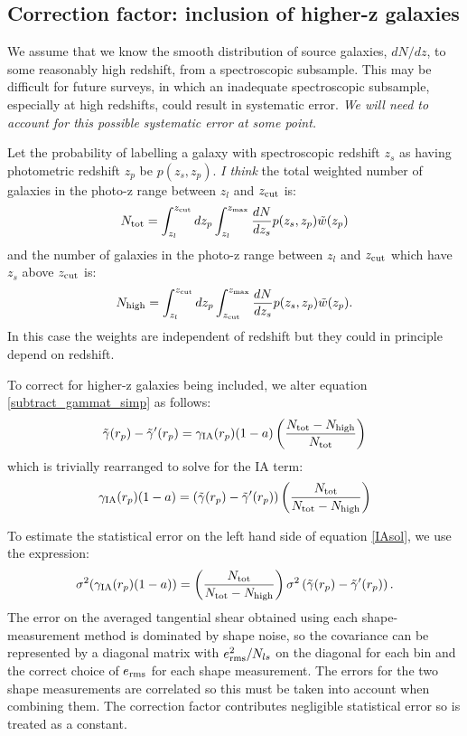 \documentclass[onecolumn,amsmath,aps,fleqn, superscriptaddress]{revtex4}
\begin{document}
\subsection*{Correction factor: inclusion of higher-z galaxies}
We assume that we know the smooth distribution of source galaxies, $dN / dz$, to some reasonably high redshift, from a spectroscopic subsample. This may be difficult for future surveys, in which an inadequate spectroscopic subsample, especially at high redshifts, could result in systematic error. {\it We will need to account for this possible systematic error at some point.}

Let the probability of labelling a galaxy with spectroscopic redshift $z_s$ as having photometric redshift $z_p$ be $p(z_s, z_p)$. {\it I think} the total weighted number of galaxies in the photo-z range between $z_l$ and $z_{\rm cut}$ is:
\begin{equation}
N_{\rm tot} = \int_{z_l}^{z_{\rm cut}} dz_p \int_{z_l}^{z_{\rm max}} \frac{dN}{dz_s} p(z_s, z_p) \tilde{w}(z_p)
\label{tot}
\end{equation}
and the number of galaxies in the photo-z range between $z_l$ and $z_{\rm cut}$ which have $z_s$ above $z_{\rm cut}$ is:
\begin{equation}
N_{\rm high} = \int_{z_l}^{z_{\rm cut}} dz_p \int_{z_{\rm cut}}^{z_{\rm max}} \frac{dN}{dz_s} p(z_s, z_p) \tilde{w}(z_p).
\label{high}
\end{equation}
In this case the weights are independent of redshift but they could in principle depend on redshift.

To correct for higher-z galaxies being included, we alter equation \ref{subtract_gammat_simp} as follows:
\begin{equation}
\tilde{\gamma}(r_p) - \tilde{\gamma}^\prime(r_p) = \gamma_{\rm IA}(r_p)(1-a) \left(\frac{N_{\rm tot} - N_{\rm high}}{N_{\rm tot}}\right)
\label{subtract_gammat_fac}
\end{equation}
which is trivially rearranged to solve for the IA term:
\begin{equation}
\gamma_{\rm IA}(r_p)(1-a) = \left(\tilde{\gamma}(r_p) - \tilde{\gamma}^\prime(r_p)\right) \left(\frac{N_{\rm tot}}{N_{\rm tot} - N_{\rm high}}\right)
\label{IAsol}
\end{equation}

To estimate the statistical error on the left hand side of equation \ref{IAsol}, we use the expression:
\begin{equation}
\sigma^2(\gamma_{\rm IA}(r_p)(1-a)) = \left(\frac{N_{\rm tot}}{N_{\rm tot} - N_{\rm high}}\right) \sigma^2\left(\tilde{\gamma}(r_p) - \tilde{\gamma}^\prime(r_p)\right).
\label{error}
\end{equation}
The error on the averaged tangential shear obtained using each shape-measurement method is dominated by shape noise, so the covariance can be represented by a diagonal matrix with $e_{\rm rms}^2 / N_{ls}$ on the diagonal for each bin and the correct choice of $e_{\rm rms}$ for each shape measurement. The errors for the two shape measurements are correlated so this must be taken into account when combining them. The correction factor contributes negligible statistical error so is treated as a constant.
\end{document}
